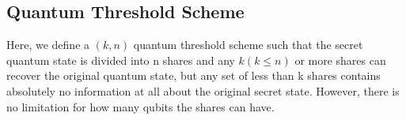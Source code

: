 \documentclass[12pt]{article}
\begin{document}
\subsection{Quantum Threshold Scheme}
Here, we define a $(k,n)$ quantum threshold scheme such that the secret quantum state is divided into n shares and any $k (k \le n)$ or more shares can recover the original quantum state, but any set of less than k shares contains absolutely no information at all about the original secret state.
However, there is no limitation for how many qubits the shares can have.


	





\end{document}
